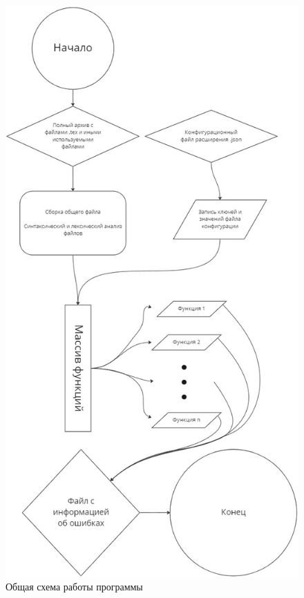    \begin{figure}[!h]
        \center
        \includegraphics[width=12cm]{Images/WorkToGo.png}
        \caption{Общая схема работы программы}
        \label{fig:3}
    \end{figure}
